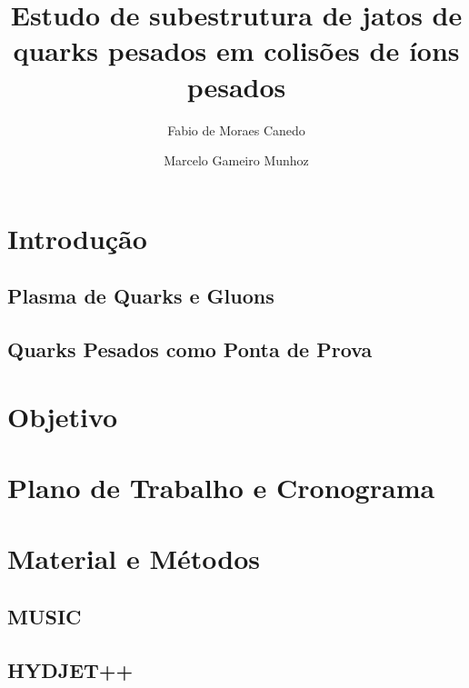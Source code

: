 \documentclass[a4paper,12pt]{article}
\title{Estudo de subestrutura de jatos de quarks pesados em colisões de íons pesados}
\author{Fabio de Moraes Canedo
\and Marcelo Gameiro Munhoz}
\begin{document}
\maketitle

\begin{abstract}

\end{abstract}

%

\section{Introdução}

\subsection{Plasma de Quarks e Gluons}


\subsection{Quarks Pesados como Ponta de Prova}


\newpage

\section{Objetivo}


\newpage

\section{Plano de Trabalho e Cronograma}


\newpage

\section{Material e Métodos}


\subsection{MUSIC}\label{music}


\subsection{HYDJET++}\label{hjet}

\end{document}

